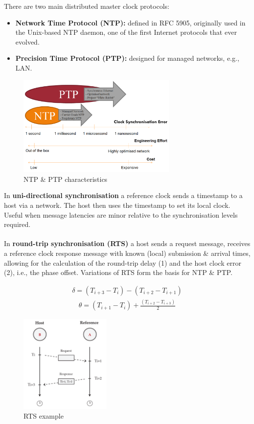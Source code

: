 \documentclass[a4paper,11pt]{article}
\begin{document}
There are two main distributed master clock protocols:
\begin{itemize}
    \item   \textbf{Network Time Protocol (NTP):} defined in RFC 5905, originally used in the Unix-based NTP daemon, one of the first Internet protocols that ever evolved.
    \item   \textbf{Precision Time Protocol (PTP):} designed for managed networks, e.g., LAN.
\end{itemize}

\begin{figure}[H]
    \centering
    \includegraphics[width=0.7\textwidth]{./images/ntpvsptp.png}
    \caption{NTP \& PTP characteristics}
\end{figure}

In \textbf{uni-directional synchronisation} a reference clock sends a timestamp to a host via a network.
The host then uses the timestamp to set its local clock.
Useful when message latencies are minor relative to the synchronisation levels required.
\\\\
In \textbf{round-trip synchronisation (RTS)} a host sends a request message, receives a reference clock response message with known (local) submission \& arrival times, allowing for the calculation of the round-trip delay (1) and the host clock error (2), i.e., the phase offset.
Variations of RTS form the basis for NTP \& PTP.

\begin{align}
    \delta = (T_{i+3} - T_i) - (T_{i+2} - T_{i+1})
\end{align}
\begin{align}
    \theta = (T_{i+1}-T_i) + \frac{(T_{i+2}-T_{i+3})}{2}
\end{align}

\begin{figure}[H]
    \centering
    \includegraphics[width=0.4\textwidth]{./images/rts.png}
    \caption{ RTS example }
\end{figure}
\end{document}
